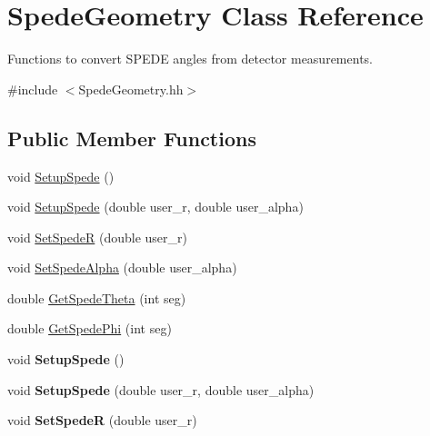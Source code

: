 \hypertarget{class_spede_geometry}{}\section{Spede\+Geometry Class Reference}
\label{class_spede_geometry}


Functions to convert S\+P\+E\+DE angles from detector measurements.  




{\ttfamily \#include $<$Spede\+Geometry.\+hh$>$}

\subsection*{Public Member Functions}
\begin{DoxyCompactItemize}
\item 
void \hyperlink{class_spede_geometry_aff2cf68512c9a78eb117ff1ea44e95f0}{Setup\+Spede} ()
\item 
void \hyperlink{class_spede_geometry_ae79185d5c0e1d21a1a26ef824038ce9c}{Setup\+Spede} (double user\+\_\+r, double user\+\_\+alpha)
\item 
void \hyperlink{class_spede_geometry_ad17f4485ee83860a40082d8c8af5237c}{Set\+SpedeR} (double user\+\_\+r)
\item 
void \hyperlink{class_spede_geometry_a94c3f5b2dbf4490db7d72514c8abe340}{Set\+Spede\+Alpha} (double user\+\_\+alpha)
\item 
double \hyperlink{class_spede_geometry_a05865b0752fb518337a9a16f8fba9085}{Get\+Spede\+Theta} (int seg)
\item 
double \hyperlink{class_spede_geometry_a93bd92636bce1259b189bb17275d238d}{Get\+Spede\+Phi} (int seg)
\item 
\mbox{\label{class_spede_geometry_aff2cf68512c9a78eb117ff1ea44e95f0}} 
void {\bfseries Setup\+Spede} ()
\item 
\mbox{\label{class_spede_geometry_ae79185d5c0e1d21a1a26ef824038ce9c}} 
void {\bfseries Setup\+Spede} (double user\+\_\+r, double user\+\_\+alpha)
\item 
\mbox{\label{class_spede_geometry_ad17f4485ee83860a40082d8c8af5237c}} 
void {\bfseries Set\+SpedeR} (double user\+\_\+r)
\item 
\mbox{\label{class_spede_geometry_a94c3f5b2dbf4490db7d72514c8abe340}} 

\end{DoxyCompactItemize}
